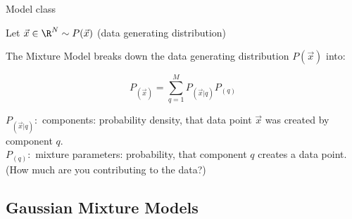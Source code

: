\begin{frame}{Model class}

Let $\vec x \in \R^N \sim P(\vec x)$ (data generating distribution)

The Mixture Model breaks down the data generating distribution $P(\vec x)$ into:

\begin{equation}
	P_{(\vec{x})} = \sum_{q=1}^{M} P_{(\vec{x} | q)} P_{(q)}
\end{equation}
	
$P_{(\vec{x} | q)}:$ components: probability density, that data point $\vec{x}$ was created by component $q$.
\\\vspace{0.3cm}
$P_{(q)}:$ mixture parameters: probability, that component $q$ creates a data point. (How much are you contributing to the data?)

\end{frame}

\subsection{Gaussian Mixture Models}


